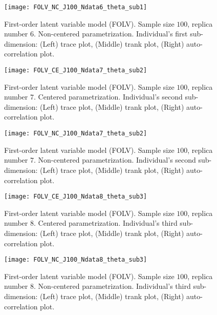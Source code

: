 %
\begin{figure}[H]
	\centering
	\texttt{[image: FOLV\_NC\_J100\_Ndata6\_theta\_sub1]}
	\caption[First-order latent variable model (FOLV). Sample size $100$, replica number $6$. Non-centered parametrization. Individual's first sub-dimension. Trace, trank and auto-correlation plots.]%
	{First-order latent variable model (FOLV). Sample size $100$, replica number $6$. Non-centered parametrization. Individual's first sub-dimension: (Left) trace plot, (Middle) trank plot, (Right) auto-correlation plot.}
	\label{fig:FOLV_NC_chains4}
\end{figure}
%
\begin{figure}[H]
	\centering
	\texttt{[image: FOLV\_CE\_J100\_Ndata7\_theta\_sub2]}
	\caption[First-order latent variable model (FOLV). Sample size $100$, replica number $7$. Centered parametrization. Individual's second sub-dimension. Trace, trank and auto-correlation plots.]%
	{First-order latent variable model (FOLV). Sample size $100$, replica number $7$. Centered parametrization. Individual's second sub-dimension: (Left) trace plot, (Middle) trank plot, (Right) auto-correlation plot.}
	\label{fig:FOLV_CE_chains5}
\end{figure}
%
\begin{figure}[H]
	\centering
	\texttt{[image: FOLV\_NC\_J100\_Ndata7\_theta\_sub2]}
	\caption[First-order latent variable model (FOLV). Sample size $100$, replica number $7$. Non-centered parametrization. Individual's second sub-dimension. Trace, trank and auto-correlation plots.]%
	{First-order latent variable model (FOLV). Sample size $100$, replica number $7$. Non-centered parametrization. Individual's second sub-dimension: (Left) trace plot, (Middle) trank plot, (Right) auto-correlation plot.}
	\label{fig:FOLV_NC_chains5}
\end{figure}
%
\begin{figure}[H]
	\centering
	\texttt{[image: FOLV\_CE\_J100\_Ndata8\_theta\_sub3]}
	\caption[First-order latent variable model (FOLV). Sample size $100$, replica number $8$. Centered parametrization. Individual's third sub-dimension. Trace, trank and auto-correlation plots.]%
	{First-order latent variable model (FOLV). Sample size $100$, replica number $8$. Centered parametrization. Individual's third sub-dimension: (Left) trace plot, (Middle) trank plot, (Right) auto-correlation plot.}
	\label{fig:FOLV_CE_chains6}
\end{figure}
%
\begin{figure}[H]
	\centering
	\texttt{[image: FOLV\_NC\_J100\_Ndata8\_theta\_sub3]}
	\caption[First-order latent variable model (FOLV). Sample size $100$, replica number $8$. Non-centered parametrization. Individual's third sub-dimension. Trace, trank and auto-correlation plots.]%
	{First-order latent variable model (FOLV). Sample size $100$, replica number $8$. Non-centered parametrization. Individual's third sub-dimension: (Left) trace plot, (Middle) trank plot, (Right) auto-correlation plot.}
	\label{fig:FOLV_NC_chains6}
\end{figure}
